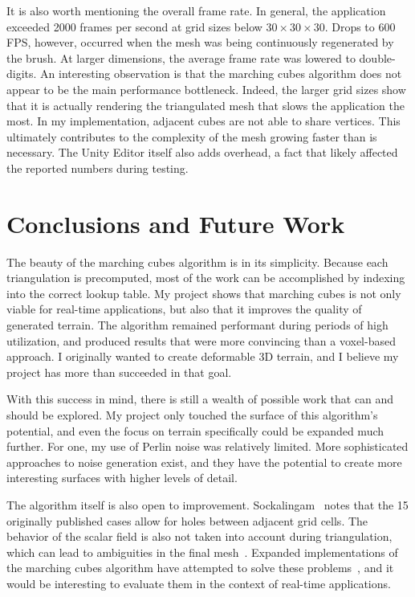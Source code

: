 \documentclass[pageno]{jpaper}
\begin{document}
It is also worth mentioning the overall frame rate. In general, the application exceeded 2000 frames per second at grid sizes below $30\times30\times30$. Drops to 600 FPS, however, occurred when the mesh was being continuously regenerated by the brush. At larger dimensions, the average frame rate was lowered to double-digits. An interesting observation is that the marching cubes algorithm does not appear to be the main performance bottleneck. Indeed, the larger grid sizes show that it is actually rendering the triangulated mesh that slows the application the most. In my implementation, adjacent cubes are not able to share vertices. This ultimately contributes to the complexity of the mesh growing faster than is necessary. The Unity Editor itself also adds overhead, a fact that likely affected the reported numbers during testing.

\section{Conclusions and Future Work}

The beauty of the marching cubes algorithm is in its simplicity. Because each triangulation is precomputed, most of the work can be accomplished by indexing into the correct lookup table. My project shows that marching cubes is not only viable for real-time applications, but also that it improves the quality of generated terrain. The algorithm remained performant during periods of high utilization, and produced results that were more convincing than a voxel-based approach. I originally wanted to create deformable 3D terrain, and I believe my project has more than succeeded in that goal.

With this success in mind, there is still a wealth of possible work that can and should be explored. My project only touched the surface of this algorithm's potential, and even the focus on terrain specifically could be expanded much further. For one, my use of Perlin noise was relatively limited. More sophisticated approaches to noise generation exist, and they have the potential to create more interesting surfaces with higher levels of detail.

The algorithm itself is also open to improvement. Sockalingam~\cite{kieran} notes that the 15 originally published cases allow for holes between adjacent grid cells. The behavior of the scalar field is also not taken into account during triangulation, which can lead to ambiguities in the final mesh~\cite{kieran}. Expanded implementations of the marching cubes algorithm have attempted to solve these problems~\cite{kieran}, and it would be interesting to evaluate them in the context of real-time applications.
\end{document}
